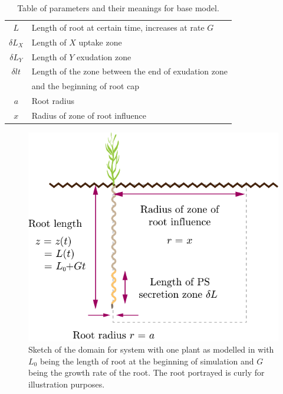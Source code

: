 \documentclass[11pt]{article}
\numberwithin{equation}{section}
\begin{document}
\begin{table}[!htb]
\begin{center}
\begin{tabular}{cl}
	$L$ & Length of root at certain time, increases at rate $G$ \\
	$\delta L_{X}$ & Length of $X$ uptake zone \\
	$\delta L_{Y}$ & Length of $Y$ exudation zone  \\	
	$\delta lt$ & Length of the zone between the end of exudation zone\\& and the beginning of root cap \\
	$a$ & Root radius \\
	$x$ & Radius of zone of root influence \\
\bottomrule
\end{tabular}
\caption{Table of parameters and their meanings for base model.
\label{t:First-model-params}}
\end{center}
\end{table}

\begin{figure}[!h]
    \centering
    \includegraphics[scale=0.7]{Figures/First-plot.pdf}
    \caption{Sketch of the domain for system with one plant as modelled in \cite{Ptashnyk-2011} with $L_0$ being the length of root at the beginning of simulation and $G$ being the growth rate of the root. The root portrayed is curly for illustration purposes.}
    \label{fig:geom}
\end{figure}
\end{document}
